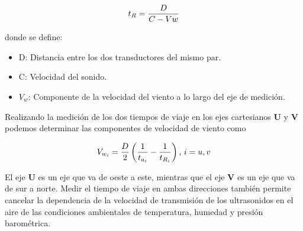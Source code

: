\begin{equation}
  \centering
  t_{R} = \frac{D}{C - Vw}
  \label{eq:t_R}
\end{equation}

donde se define:
\begin{itemize}
  \item D: Distancia entre los dos transductores del mismo par.
  \item C: Velocidad del sonido.
  \item $V_{w}$: Componente de la velocidad del viento a lo largo del eje de medición.
\end{itemize}

Realizando la medición de los dos tiempos de viaje en los ejes cartesianos $\mathbf{U}$ y $\mathbf{V}$ podemos determinar las componentes de velocidad de viento como 


\begin{equation}
  \centering
  V_{w_{i}} = \frac{D}{2}\left(\frac{1}{t_{a_{i}}}-\frac{1}{t_{R_{i}}}\right)\text{,  } i= u,v
  \label{eq:velViento}
\end{equation}

El eje $\mathbf{U}$ es un eje que va de oeste a este, mientras que el eje $\mathbf{V}$ es un eje que va de sur a norte. Medir el tiempo de viaje en ambas direcciones también permite cancelar la dependencia de la velocidad de transmisión de los ultrasonidos en el aire de las condiciones ambientales de temperatura, humedad y presión barométrica.



